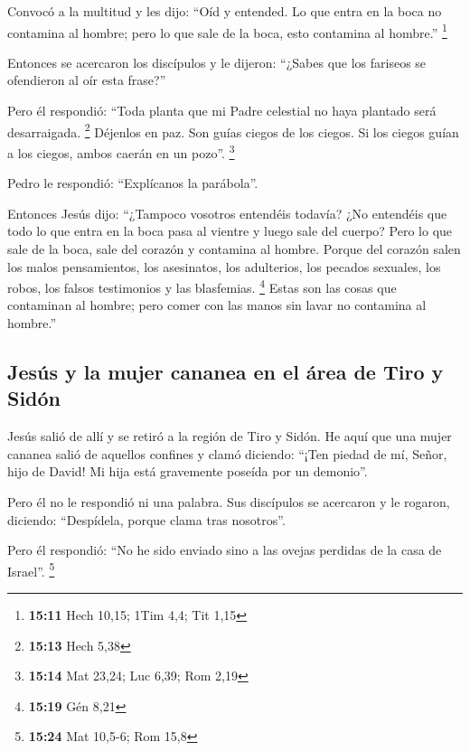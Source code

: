\begin{paracol}{2}
 Convocó a la multitud y les dijo: ``Oíd y entended.
 Lo que entra en la boca no contamina al hombre; pero lo
que sale de la boca, esto contamina al hombre.'' \footnote{\textbf{15:11}
  Hech 10,15; 1Tim 4,4; Tit 1,15}

 Entonces se acercaron los discípulos y le dijeron:
``¿Sabes que los fariseos se ofendieron al oír esta frase?''

 Pero él respondió: ``Toda planta que mi Padre celestial
no haya plantado será desarraigada. \footnote{\textbf{15:13} Hech 5,38}
 Déjenlos en paz. Son guías ciegos de los ciegos. Si los
ciegos guían a los ciegos, ambos caerán en un pozo''. \footnote{\textbf{15:14}
  Mat 23,24; Luc 6,39; Rom 2,19}

 Pedro le respondió: ``Explícanos la parábola''.

 Entonces Jesús dijo: ``¿Tampoco vosotros entendéis
todavía?  ¿No entendéis que todo lo que entra en la boca
pasa al vientre y luego sale del cuerpo?  Pero lo que
sale de la boca, sale del corazón y contamina al hombre. 
Porque del corazón salen los malos pensamientos, los asesinatos, los
adulterios, los pecados sexuales, los robos, los falsos testimonios y
las blasfemias. \footnote{\textbf{15:19} Gén 8,21}  Estas
son las cosas que contaminan al hombre; pero comer con las manos sin
lavar no contamina al hombre.''

\hypertarget{jesuxfas-y-la-mujer-cananea-en-el-uxe1rea-de-tiro-y-siduxf3n}{%
\subsection{Jesús y la mujer cananea en el área de Tiro y
Sidón}\label{jesuxfas-y-la-mujer-cananea-en-el-uxe1rea-de-tiro-y-siduxf3n}}

 Jesús salió de allí y se retiró a la región de Tiro y
Sidón.  He aquí que una mujer cananea salió de aquellos
confines y clamó diciendo: ``¡Ten piedad de mí, Señor, hijo de David! Mi
hija está gravemente poseída por un demonio''.

 Pero él no le respondió ni una palabra. Sus discípulos
se acercaron y le rogaron, diciendo: ``Despídela, porque clama tras
nosotros''.

 Pero él respondió: ``No he sido enviado sino a las
ovejas perdidas de la casa de Israel''. \footnote{\textbf{15:24} Mat
  10,5-6; Rom 15,8}


\end{paracol}

